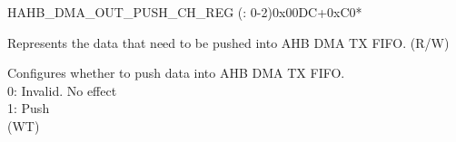 \begin{register}{H}{AHB\_DMA\_OUT\_PUSH\_CH\_REG (: 0-2)}{0x00DC+0xC0*}\label{regdesc:AHBDMAOUTPUSHCHNREG}
%
%
%
\regnewline%
\begin{regdesc}\begin{reglist}
\label{fielddesc:AHBDMAOUTFIFOWDATACHN}\item [AHB\_DMA\_OUTFIFO\_WDATA\_CH\regindex{n}] Represents the data that need to be pushed into AHB DMA TX FIFO. (R/W)
\label{fielddesc:AHBDMAOUTFIFOPUSHCHN}\item [AHB\_DMA\_OUTFIFO\_PUSH\_CH\regindex{n}] Configures whether to push data into AHB DMA TX FIFO.\\
0: Invalid. No effect\\
1: Push\\ (WT)
\end{reglist}\end{regdesc}
\end{register}


